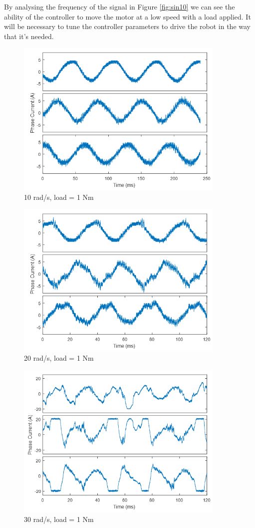 By analysing the frequency of the signal in Figure \ref{fig:sin10} we can see the ability of the controller to move the motor at a low speed with a load applied. It will be necessary to tune the controller parameters to drive the robot in the way that it’s needed.

\begin{figure}[h!p]
\centering
\includegraphics[width=10cm]{Images/waveforms/sin11.png} 
\caption[sin11]{10 rad/s, load = 1 Nm}
\label{fig:sin11}
\end{figure}

\begin{figure}[h!p]
\centering
\includegraphics[width=10cm]{Images/waveforms/sin12.png} 
\caption[sin12]{20 rad/s, load = 1 Nm}
\label{fig:sin12}
\end{figure}

\begin{figure}[h!p]
\centering
\includegraphics[width=10cm]{Images/waveforms/sin13.png} 
\caption[sin13]{30 rad/s, load = 1 Nm}
\label{fig:sin13}
\end{figure}


